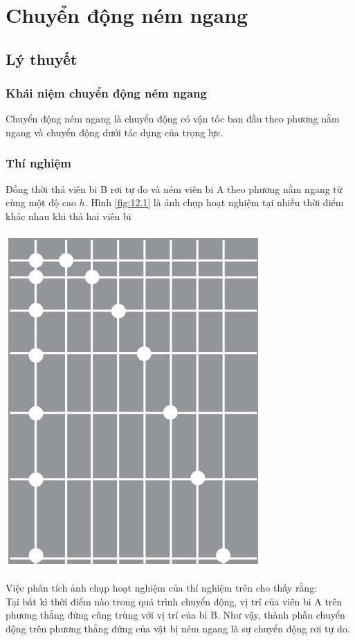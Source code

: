 \let\lesson\undefined
\newcommand{\lesson}{\phantomlesson{Bài 9: Chuyển động ném}}
\chapter[Chuyển động ném ngang]{Chuyển động ném ngang}
\setcounter{section}{0}
\section{Lý thuyết}
\subsection{Khái niệm chuyển động ném ngang}
Chuyển động ném ngang là chuyển động có vận tốc ban đầu theo phương nằm ngang và chuyển động dưới tác dụng của trọng lực.
\subsection{Thí nghiệm}
Đồng thời thả viên bi B rơi tự do và ném viên bi A theo phương nằm ngang từ cùng một độ cao $h$. Hình \ref{fig:12.1} là ảnh chụp hoạt nghiệm tại nhiều thời điểm khác nhau khi thả hai viên bi
\begin{center}
	\includegraphics[width=0.2\linewidth]{../figs/VN10-2023-PH-TP012-1}
	\label{fig:12.1}
\end{center}
Việc phân tích ảnh chụp hoạt nghiệm của thí nghiệm trên cho thấy rằng:\\
Tại bất kì thời điểm nào trong quá trình chuyển động, vị trí của viên bi A trên phương thẳng đứng cũng trùng với vị trí của bi B. Như vậy, thành phần chuyển động trên phương thẳng đứng của vật bị ném ngang là sự chuyển động rơi tự do.

